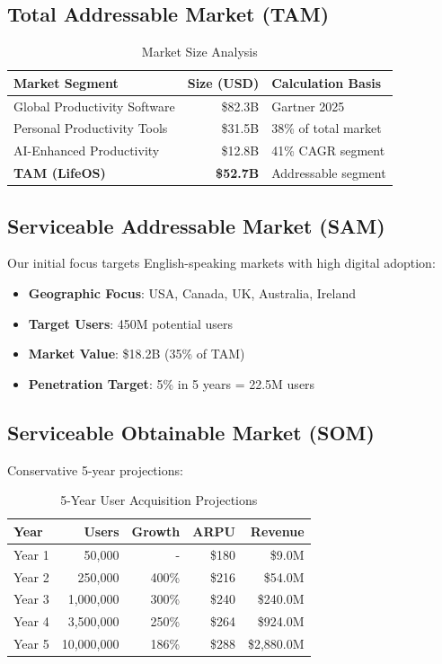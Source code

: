 \subsection{Total Addressable Market (TAM)}

\begin{table}[H]
\centering
\caption{Market Size Analysis}
\begin{tabular}{|l|r|p{6cm}|}
\hline
\rowcolor{lightgray}
\textbf{Market Segment} & \textbf{Size (USD)} & \textbf{Calculation Basis} \\
\hline
Global Productivity Software & \$82.3B & Gartner 2025 \\
\hline
Personal Productivity Tools & \$31.5B & 38\% of total market \\
\hline
AI-Enhanced Productivity & \$12.8B & 41\% CAGR segment \\
\hline
\textbf{TAM (LifeOS)} & \textbf{\$52.7B} & Addressable segment \\
\hline
\end{tabular}
\end{table}

\subsection{Serviceable Addressable Market (SAM)}

Our initial focus targets English-speaking markets with high digital adoption:

\begin{itemize}
    \item \textbf{Geographic Focus}: USA, Canada, UK, Australia, Ireland
    \item \textbf{Target Users}: 450M potential users
    \item \textbf{Market Value}: \$18.2B (35\% of TAM)
    \item \textbf{Penetration Target}: 5\% in 5 years = 22.5M users
\end{itemize}

\subsection{Serviceable Obtainable Market (SOM)}

Conservative 5-year projections:

\begin{table}[H]
\centering
\caption{5-Year User Acquisition Projections}
\begin{tabular}{|l|r|r|r|r|}
\hline
\rowcolor{lightgray}
\textbf{Year} & \textbf{Users} & \textbf{Growth} & \textbf{ARPU} & \textbf{Revenue} \\
\hline
Year 1 & 50,000 & - & \$180 & \$9.0M \\
\hline
Year 2 & 250,000 & 400\% & \$216 & \$54.0M \\
\hline
Year 3 & 1,000,000 & 300\% & \$240 & \$240.0M \\
\hline
Year 4 & 3,500,000 & 250\% & \$264 & \$924.0M \\
\hline
Year 5 & 10,000,000 & 186\% & \$288 & \$2,880.0M \\
\hline
\end{tabular}
\end{table}

